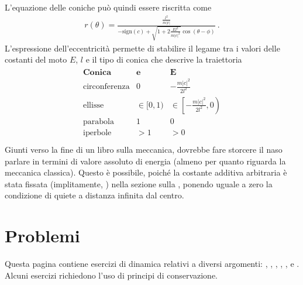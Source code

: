 \documentclass[letterpaper,10pt,italian]{jupyterBook}
\begin{document}
\sphinxAtStartPar
L’equazione delle coniche può quindi essere riscritta come
\begin{equation}\label{equation:ch/mechanics/dynamics-central:eq:dynamics:central:r-2:trajectory:el}
\begin{split}r(\theta) = \frac{\frac{l^2}{m|c|}}{-\text{sign}(c) + \sqrt{1 + 2 \frac{E l^2}{m|c|^2}} \cos(\theta-\phi)} \ .\end{split}
\end{equation}
\sphinxAtStartPar
L’espressione dell’eccentricità permette di stabilire il legame tra i valori delle costanti del moto \(E\), \(l\) e il tipo di conica che descrive la traiettoria
\begin{equation*}
\begin{split}\begin{array}{lcc}
\textbf{Conica} & \textbf{e} & \textbf{E} \\ \hline
\text{circonferenza} & 0           & -\frac{m|c|^2}{2l^2} \\ 
\text{ellisse}       & \in [0,1)   & \in \left[-\frac{m|c|^2}{2l^2}, 0 \right) \\ 
\text{parabola}      & 1           & 0                    \\ 
\text{iperbole}      & > 1         & > 0                  \\ 
\end{array}\end{split}
\end{equation*}
\sphinxAtStartPar
{} Giunti verso la fine di un libro sulla meccanica, dovrebbe fare storcere il naso parlare in termini di valore assoluto di energia (almeno per quanto riguarda la meccanica classica). Questo è possibile, poiché la costante additiva arbitraria è stata fissata (implitamente,  ) nella sezione sulla {\hyperref[\detokenize{ch/mechanics/dynamics-central:physics-hs-mechanics-dynamics-motion-central-energy}]{}}, ponendo uguale a zero la condizione di quiete a distanza infinita dal centro.

\sphinxstepscope


\section{Problemi}
\label{\detokenize{ch/mechanics/dynamics-problems:problemi}}\label{\detokenize{ch/mechanics/dynamics-problems:physics-hs-mechanics-dynamics-problems}}\label{\detokenize{ch/mechanics/dynamics-problems::doc}}
\sphinxAtStartPar
Questa pagina contiene esercizi di dinamica relativi a diversi argomenti: , , , , ,  e . Alcuni esercizi richiedono l’uso di principi di conservazione.
\end{document}
